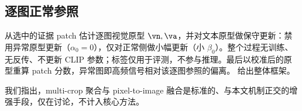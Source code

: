 \subsection{逐图正常参照}
从选中的证据 patch 估计逐图视觉原型 $\vn,\va$，并对文本原型做保守更新：禁用异常原型更新（$\alpha_0=0$），仅对正常侧做小幅更新（小 $\beta_0$）。整个过程无训练、无反传、不更新 CLIP 参数；标签仅用于评测，不参与推理。最后以校准后的原型重算 patch 分数，异常图即高频信号相对该逐图参照的偏离。 给出整体框架。



我们指出，multi-crop 聚合与 pixel-to-image 融合是标准的、与本文机制正交的增强手段，仅在讨论，不计入核心方法。

